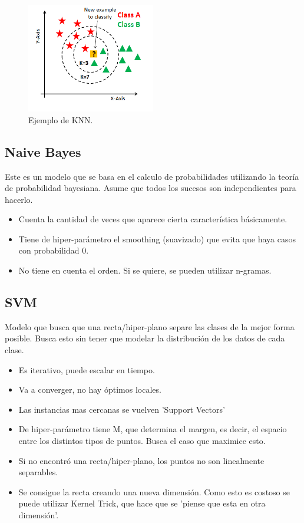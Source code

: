 \documentclass[titlepage,a4paper]{article}
\begin{document}
\begin{figure}[!htb]
    \centering
    \includegraphics[width=0.5\textwidth]{imagenesResumen/KNN.png}
    \caption{Ejemplo de KNN.}
\end{figure}


\subsection{Naive Bayes}
Este es un modelo que se basa en el calculo de probabilidades utilizando la teoría de probabilidad bayesiana. Asume que todos los sucesos son independientes para hacerlo.

\begin{itemize}
    \item Cuenta la cantidad de veces que aparece cierta característica básicamente.
    \item Tiene de hiper-parámetro el smoothing (suavizado) que evita que haya casos con probabilidad 0.
    \item No tiene en cuenta el orden. Si se quiere, se pueden utilizar n-gramas.
    
\end{itemize}

\newpage

\subsection{SVM}

Modelo que busca que una recta/hiper-plano separe las clases de la mejor forma posible. Busca esto sin tener que modelar la distribución de los datos de cada clase.

\begin{itemize}
    \item Es iterativo, puede escalar en tiempo.
    \item Va a converger, no hay óptimos locales.
    \item Las instancias mas cercanas se vuelven 'Support Vectors'
    \item De hiper-parámetro tiene M, que determina el margen, es decir, el espacio entre los distintos tipos de puntos. Busca el caso que maximice esto.
    \item Si no encontró una recta/hiper-plano, los puntos no son linealmente separables.
    \item Se consigue la recta creando una nueva dimensión. Como esto es costoso se puede utilizar Kernel Trick, que hace que se 'piense que esta en otra dimensión'.
\end{itemize}
\end{document}
